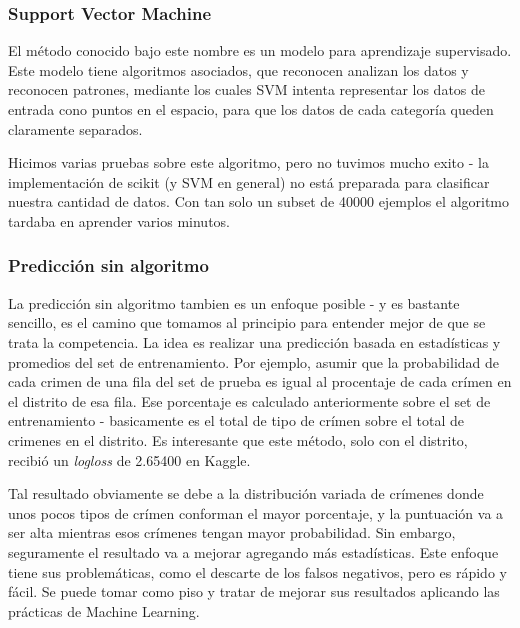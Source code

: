\subsubsection{Support Vector Machine} %
\label{ssub:support_vector_machine}

El método conocido bajo este nombre es un modelo para aprendizaje supervisado. Este modelo tiene algoritmos asociados, que reconocen analizan los datos y reconocen patrones, mediante los cuales SVM intenta representar los datos de entrada cono puntos en el espacio, para que los datos de cada categoría queden claramente separados.

Hicimos varias pruebas sobre este algoritmo, pero no tuvimos mucho exito - la implementación de scikit (y SVM en general) no está preparada para clasificar nuestra cantidad de datos. Con tan solo un subset de 40000 ejemplos el algoritmo tardaba en aprender varios minutos.


\subsubsection{Predicción sin algoritmo} %
\label{ssub:prediccion_sin_algoritmo}

La predicción sin algoritmo tambien es un enfoque posible - y es bastante sencillo, es el camino que tomamos al principio para entender mejor de que se trata la competencia. La idea es realizar una predicción basada en estadísticas y promedios del set de entrenamiento. Por ejemplo, asumir que la probabilidad de cada crimen de una fila del set de prueba es igual al procentaje de cada crímen en el distrito de esa fila. Ese porcentaje es calculado anteriormente sobre el set de entrenamiento - basicamente es el total de tipo de crímen sobre el total de crimenes en el distrito. Es interesante que este método, solo con el distrito, recibió un \textit{logloss} de 2.65400 en Kaggle.

Tal resultado obviamente se debe a la distribución variada de crímenes donde unos pocos tipos de crímen conforman el mayor porcentaje, y la puntuación va a ser alta mientras esos crímenes tengan mayor probabilidad. Sin embargo, seguramente el resultado va a mejorar agregando más estadísticas. Este enfoque tiene sus problemáticas, como el descarte de los falsos negativos, pero es rápido y fácil. Se puede tomar como piso y tratar de mejorar sus resultados aplicando las prácticas de Machine Learning.



